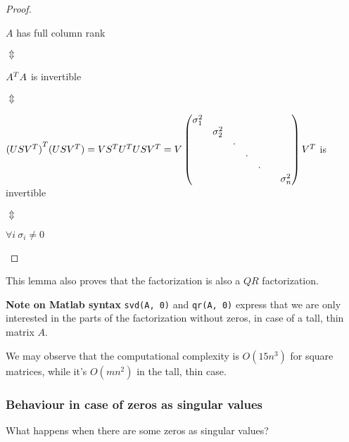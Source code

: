 \documentclass[ComputationalMathematics.tex]{subfiles}
\begin{document}
\begin{proof}
  \begin{center}
  $A$ has full column rank 
  
  $\Updownarrow$

  ${A}^{T}A$ is invertible
  
$\Updownarrow$
  
  ${(US{V}^{T})}^{T} (US{V}^{T}) = V{S}^{T}{U}^{T}US{V}^{T}
    = V \begin{pmatrix}
    \sigma_{1}^2 & & & & &\\
    & \sigma_{2}^2 & & & &\\
    & & \cdot & & &\\
    & & & \cdot & &\\
    & & & & \cdot &\\
    & & & & & & \sigma_{n}^2\\ 
  \end{pmatrix} {V}^{T}$
  is invertible 
  
$\Updownarrow$
  
  $\forall i ~ \sigma_i \neq 0$
\end{center}
\end{proof}

\begin{obs}
This lemma also proves that the factorization is also a $QR$ factorization.
\end{obs}
\begin{myframe}{\bf Note on Matlab syntax}
  \texttt{svd(A, 0)} and \texttt{qr(A, 0)} express that we are only interested in the parts of the factorization without zeros, in case of a tall, thin matrix $A$.
\end{myframe}
 We may observe that the computational complexity is $O(15n^3)$ for square matrices, while it's $O(mn^2)$ in the tall, thin case.

 \subsubsection{Behaviour in case of zeros as singular values}
 What happens when there are some zeros as singular values? 
 
\end{document}
